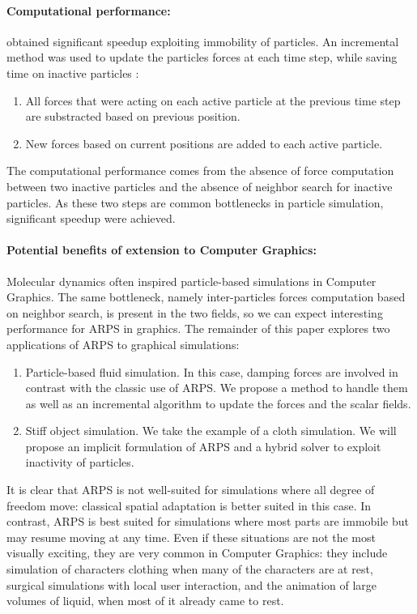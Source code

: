 \documentclass[11pt, oneside, a4paper]{memoir}
\begin{document}
\paragraph*{Computational performance:}
\cite{Artemova2012} obtained significant speedup exploiting immobility of particles.
An incremental method was used to update the particles forces at each time step, while saving time on inactive particles :
\begin{enumerate}
    \item All forces that were acting on each active particle at the previous time step are substracted based on previous position.
    \item New forces based on current positions are added to each active particle.
\end{enumerate}
The computational performance comes from the absence of force computation between
two inactive particles and the absence of neighbor search for inactive particles.
As these two steps are common bottlenecks in particle simulation, significant speedup were achieved.

\paragraph*{Potential benefits of extension to Computer Graphics:}
Molecular dynamics often inspired particle-based simulations in Computer Graphics. The same bottleneck, namely inter-particles forces computation based on neighbor search, is present in the two fields, so we can expect interesting performance for ARPS in graphics. The remainder of this paper explores two applications of ARPS to graphical simulations:
\begin{enumerate}
\item Particle-based fluid simulation. In this case, damping forces are involved in contrast with the classic use of ARPS.
We propose a method to handle them as well as an incremental algorithm to update the forces and the scalar fields.
\item Stiff object simulation. We take the example of a cloth simulation.
We will propose an implicit formulation of ARPS and a hybrid solver to exploit inactivity of particles.
\end{enumerate}
It is clear that ARPS is not well-suited for simulations where all degree of freedom move: classical spatial adaptation is better suited in this case. In contrast, ARPS is best suited for simulations where most parts are immobile but may resume moving at any time. Even if these situations are not the most visually exciting, they are very common in Computer Graphics: they include simulation of characters clothing when many of the characters are at rest, surgical simulations with local user interaction, and the animation of large volumes of liquid, when most of it already came to rest.
\end{document}
